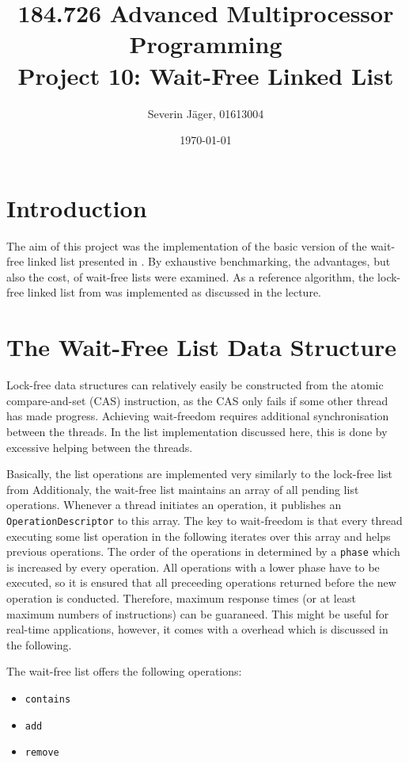 \documentclass[a4paper, 12pt]{article}
\title{184.726 Advanced Multiprocessor Programming\\
	   Project 10: Wait-Free Linked List}
\author{
  Severin Jäger, 01613004
}
\date{\today}
\begin{document}
\maketitle
\tableofcontents
\pagebreak


\section{Introduction}

The aim of this project was the implementation of the basic version of the wait-free linked list presented in \cite{timnat12}. By exhaustive benchmarking, the advantages, but also the cost, of wait-free lists were examined. As a reference algorithm, the lock-free linked list from \cite{harris01} was implemented as discussed in the lecture.

\section{The Wait-Free List Data Structure}

Lock-free data structures can relatively easily be constructed from the atomic compare-and-set (CAS) instruction, as the CAS only fails if some other thread has made progress. Achieving wait-freedom requires additional synchronisation between the threads. In the list implementation discussed here, this is done by excessive helping between the threads.

Basically, the list operations are implemented very similarly to the lock-free list from  \cite{harris01} Additionaly, the wait-free list maintains an array of all pending list operations. Whenever a thread initiates an operation, it publishes an \verb|OperationDescriptor| to this array. The key to wait-freedom is that every thread executing some list operation in the following iterates over this array and helps previous operations. The order of the operations in determined by a \verb|phase| which is increased by every operation. All operations with a lower phase have to be executed, so it is ensured that all preceeding operations returned before the new operation is conducted. Therefore, maximum response times (or at least maximum numbers of instructions) can be guaraneed. This might be useful for real-time applications, however, it comes with a overhead which is discussed in the following.

The wait-free list offers the following operations:
\begin{itemize}
\setlength\itemsep{0em}
\item{\verb|contains|}
\item{\verb|add|}
\item{\verb|remove|}
\end{itemize}
\end{document}
